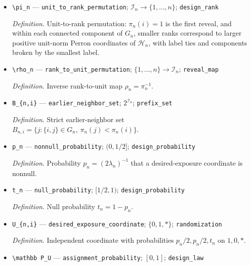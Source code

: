 \documentclass{article}
\begin{document}
\begin{itemize}
  \item \texttt{\textbackslash{}\allowbreak{}pi\_\allowbreak{}n} --- \texttt{unit\_\allowbreak{}to\_\allowbreak{}rank\_\allowbreak{}permutation}; \(\mathcal I_n\to\{1,\ldots,n\}\); \texttt{design\_\allowbreak{}rank}
  \par\smallskip\noindent\emph{Definition.} Unit-to-rank permutation: \(\pi_n(i)=1\) is the first reveal, and within each connected component of \(G_n\), smaller ranks correspond to larger positive unit-norm Perron coordinates of \(\mathcal H_n\), with label ties and components broken by the smallest label.
  \item \texttt{\textbackslash{}\allowbreak{}rho\_\allowbreak{}n} --- \texttt{rank\_\allowbreak{}to\_\allowbreak{}unit\_\allowbreak{}permutation}; \(\{1,\ldots,n\}\to\mathcal I_n\); \texttt{reveal\_\allowbreak{}map}
  \par\smallskip\noindent\emph{Definition.} Inverse rank-to-unit map \(\rho_n=\pi_n^{-1}\).
  \item \texttt{B\_\allowbreak{}\{n,\allowbreak{}i\}\allowbreak{}} --- \texttt{earlier\_\allowbreak{}neighbor\_\allowbreak{}set}; \(2^{\mathcal I_n}\); \texttt{prefix\_\allowbreak{}set}
  \par\smallskip\noindent\emph{Definition.} Strict earlier-neighbor set \(B_{n,i}=\{j:\{i,j\}\in G_n,\ \pi_n(j)<\pi_n(i)\}\).
  \item \texttt{p\_\allowbreak{}n} --- \texttt{nonnull\_\allowbreak{}probability}; \((0,1/2]\); \texttt{design\_\allowbreak{}probability}
  \par\smallskip\noindent\emph{Definition.} Probability \(p_n=(2\lambda_n)^{-1}\) that a desired-exposure coordinate is nonnull.
  \item \texttt{t\_\allowbreak{}n} --- \texttt{null\_\allowbreak{}probability}; \([1/2,1)\); \texttt{design\_\allowbreak{}probability}
  \par\smallskip\noindent\emph{Definition.} Null probability \(t_n=1-p_n\).
  \item \texttt{U\_\allowbreak{}\{n,\allowbreak{}i\}\allowbreak{}} --- \texttt{desired\_\allowbreak{}exposure\_\allowbreak{}coordinate}; \(\{0,1,*\}\); \texttt{randomization}
  \par\smallskip\noindent\emph{Definition.} Independent coordinate with probabilities \(p_n/2,p_n/2,t_n\) on \(1,0,*\).
  \item \texttt{\textbackslash{}\allowbreak{}mathbb P\_\allowbreak{}U} --- \texttt{assignment\_\allowbreak{}probability}; \([0,1]\); \texttt{design\_\allowbreak{}law}

\end{itemize}
\end{document}
